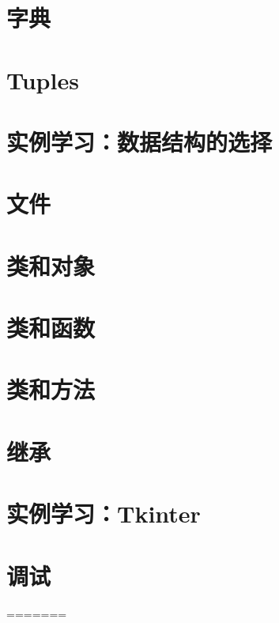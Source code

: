 \documentclass[10pt]{book}
\begin{document}
\chapter{字典}


\chapter{Tuples}


\chapter{实例学习：数据结构的选择}


\chapter{文件}


\chapter{类和对象}


\chapter{类和函数}


\chapter{类和方法}


\chapter{继承}


\chapter{实例学习：Tkinter}


\appendix
\chapter{调试}

=======







\end{document}
